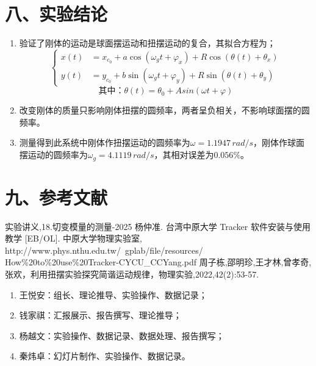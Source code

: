 \documentclass[11pt]{article}
\begin{document}
\section*{八、实验结论}
\begin{enumerate}
    \item 验证了刚体的运动是球面摆运动和扭摆运动的复合，其拟合方程为；
        $$\left\{
        \begin{aligned}
            x(t)&=x_{c_0}+a\cos(\omega_{g}t+\varphi_x)+R\cos(\theta(t)+\theta_x) \\
            y(t)&=y_{c_0}+b\sin(\omega_{g}t+\varphi_y)+R\sin(\theta(t)+\theta_y)
        \end{aligned}
        \right.$$
        $$
        \text{其中：}\theta(t)=\theta_0+Asin(\omega t+\varphi)
        $$
    \item 改变刚体的质量只影响刚体扭摆的圆频率，两者呈负相关，不影响球面摆的圆频率。
    \item 测量得到此系统中刚体作扭摆运动的圆频率为$\omega=1.1947\,rad/s$，刚体作球面摆运动的圆频率为$\omega_g=4.1119\,rad/s$，其相对误差为$0.056\%$。
\end{enumerate}

\section*{九、参考文献}

\begingroup  %
\renewcommand{\section}[2]{} 
\begin{thebibliography}{99}
     实验讲义,18.切变模量的测量-2025
     杨仲准. 台湾中原大学 Tracker 软件安装与使用教学 [EB/OL]. 中原大学物理实验室, \\ http://www.phys.nthu.edu.tw/~gplab/file/resources/\\How\%20to\%20use\%20Tracker-CYCU\_CCYang.pdf
     周子栋,邵明珍,王才林,曾孝奇,张欢，利用扭摆实验探究简谐运动规律，物理实验,2022,42(2):53-57.
\end{thebibliography}
\endgroup

\section*{十、小组分工}

\begin{enumerate}
    \item 王悦安：组长、理论推导、实验操作、数据记录；
    \item 钱家祺：汇报展示、报告撰写、理论推导；
    \item 杨越文：实验操作、数据记录、数据处理、报告撰写；
    \item 秦炜卓：幻灯片制作、实验操作、数据记录。
\end{enumerate}
\end{document}
